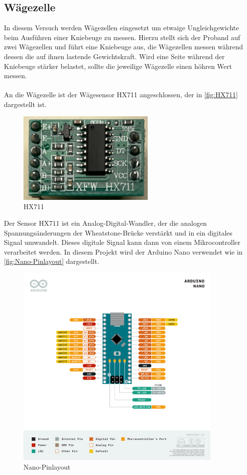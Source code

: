 \subsection{Wägezelle}
In diesem Versuch werden Wägezellen eingesetzt um etwaige Ungleichgewichte beim Ausführen einer Kniebeuge zu messen.
Hierzu stellt sich der Proband auf zwei Wägezellen und führt eine Kniebeuge aus, die Wägezellen messen während dessen die auf ihnen lastende Gewichtskraft.
Wird eine Seite während der Kniebeuge stärker belastet, sollte die jeweilige Wägezelle einen höhren Wert messen. \\ \\
An die Wägezelle ist der Wägesensor HX711 angeschlossen, der in \autoref{fig:HX711} dargestellt ist.
\begin{figure}[h!]
    \centering
    \includegraphics[width=0.6\textwidth]{img/HX711.png}
    \caption{HX711 \cite{prilchen}}
    \label{fig:HX711}
\end{figure}
Der Sensor HX711 ist ein Analog-Digital-Wandler, der die analogen Spannungsänderungen der Wheatstone-Brücke verstärkt und in ein digitales Signal umwandelt.
Dieses digitale Signal kann dann von einem Mikrocontroller verarbeitet werden.
In diesem Projekt wird der Arduino Nano verwendet wie in \autoref{fig:Nano-Pinlayout} dargestellt.
\begin{figure}[h!]
    \centering
    \includegraphics[width=0.9\textwidth]{img/Nano-Pinlayout.png}
    \caption{Nano-Pinlayout \cite{Arduino}}
    \label{fig:Nano-Pinlayout}
\end{figure}
